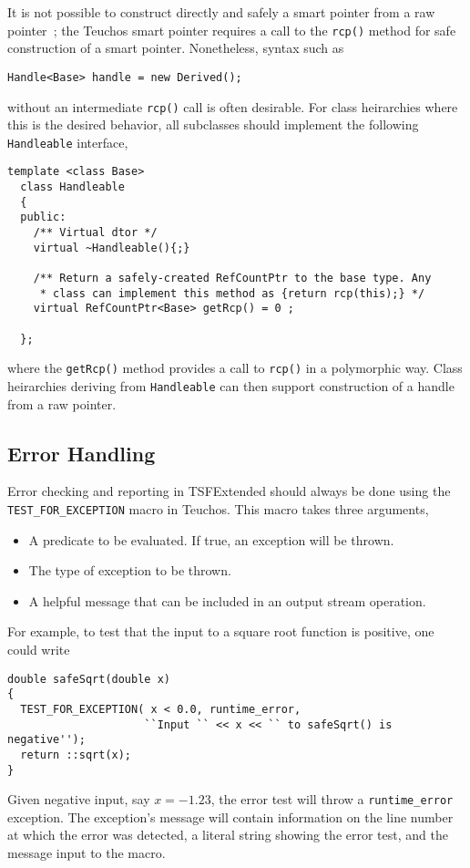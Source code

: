 It is not possible to construct directly and safely
a smart pointer from a raw pointer~\cite{ref:SmartPtrs}; the Teuchos
smart pointer requires a call to the {\tt rcp()} method for safe
construction of a smart pointer. Nonetheless,
syntax such as 
{\scriptsize\begin{verbatim}
Handle<Base> handle = new Derived();
\end{verbatim}}
without an intermediate {\tt rcp()} call is often desirable. For class
heirarchies where this is the desired behavior, all subclasses
should implement the following {\tt Handleable} interface,
{\scriptsize\begin{verbatim}
template <class Base>
  class Handleable
  {
  public:
    /** Virtual dtor */
    virtual ~Handleable(){;}

    /** Return a safely-created RefCountPtr to the base type. Any
     * class can implement this method as {return rcp(this);} */
    virtual RefCountPtr<Base> getRcp() = 0 ;
    
  };
\end{verbatim}}
where the {\tt getRcp()} method provides a call to {\tt rcp()} in 
a polymorphic way. Class heirarchies deriving from {\tt Handleable}
can then support construction of a handle from a raw pointer.

\subsection{Error Handling}

Error checking and reporting in TSFExtended should always be done using the
\verb+TEST_FOR_EXCEPTION+ macro in Teuchos. This macro takes three
arguments,
\begin{itemize}
\item A predicate to be evaluated. If true, an exception will be thrown.
\item The type of exception to be thrown.
\item A helpful message that can be included in an output stream operation.
\end{itemize}
For example, to test that the input to a square root function is positive,
one could write
{\scriptsize\begin{verbatim}
double safeSqrt(double x)
{
  TEST_FOR_EXCEPTION( x < 0.0, runtime_error, 
                     ``Input `` << x << `` to safeSqrt() is negative'');
  return ::sqrt(x);
}
\end{verbatim}}
Given negative input, say $x=-1.23$, 
the error test will throw a \verb+runtime_error+ exception. The exception's
message will contain information on the line number at which the error was 
detected, a literal string showing the error test, and the message
input to the macro. 

